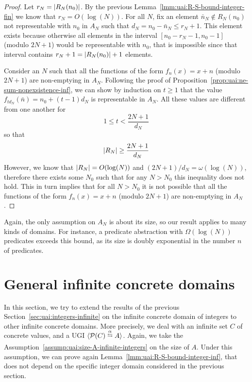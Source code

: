\begin{proof}
	Let $r_N = \lvert R_N(n_0)\rvert$. By the previous Lemma~\ref{lmm:uai:R-S-bound-integer-fin} we know that $r_N = O(\log(N))$. For all $N$, fix an element $\bar{n}_N \notin R_N(n_0)$ not representable with $n_0$ in $A_N$ such that $d_N = n_0 - \bar{n}_N \le r_N + 1$.
	This element exists because otherwise all elements in the interval $[n_0 - r_N - 1, n_0 - 1]$ (modulo $2N + 1$) would be representable with $n_0$, that is impossible since that interval contains $r_N + 1 = \lvert R_N(n_0)\rvert + 1$ elements.

	Consider an $N$ such that all the functions of the form $f_n(x) = x + n$ (modulo $2N + 1$) are non-emptying in $A_N$.
	Following the proof of Proposition~\ref{prop:uai:ne-sum-nonexsistence-inf}, we can show by induction on $t \ge 1$ that the value $f_{t d_N}(\bar{n}) = n_0 + (t - 1) d_N$ is representable in $A_N$. All these values are different from one another for
	\begin{equation*}
		1 \le t < \frac{2N + 1}{d_N}
	\end{equation*}
	so that
	\begin{equation*}
		\lvert R_N\rvert \ge \frac{2N + 1}{d_N}
	\end{equation*}
	However, we know that $\lvert R_N\rvert = O(\log(N))$ and $(2N + 1) / d_N = \omega(\log(N))$, therefore there exists some $N_0$ such that for any $N > N_0$ this inequality does not hold. This in turn implies that for all $N > N_0$ it is not possible that all the functions of the form $f_n(x) = x + n$ (modulo $2N + 1$) are non-emptying in $A_N$.
\end{proof}

Again, the only assumption on $A_N$ is about its size, so our result applies to many kinds of domains. For instance, a predicate abstraction \cite{GS97} with $\Omega(\log(N))$ predicates exceeds this bound, as its size is doubly exponential in the number $n$ of predicates.

\section{General infinite concrete domains}\label{sec:uai:infinite}
\fromhere
In this section, we try to extend the results of the previous Section~\ref{sec:uai:integers-infinite} on the infinite concrete domain of integers to other infinite concrete domains. More precisely, we deal with an infinite set $C$ of concrete values, and a UGI $\ugi{\pow(C)}{\alpha}{A}$.
Again, we take the Assumption~\ref{assump:uai:size-A-infinite-integers} on the size of $A$.
Under this assumption, we can prove again Lemma~\ref{lmm:uai:R-S-bound-integer-inf}, that does not depend on the specific integer domain considered in the previous section.

